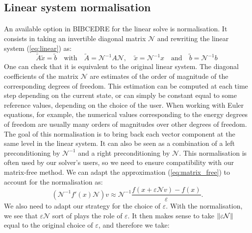     \subsection{Linear system normalisation}

      \paragraph{}
      An available option in BIBCEDRE for the linear solve is normalisation.
      It consists in taking an invertible diagonal matrix $\mathcal{N}$ and rewriting the linear system (\ref{eq:linear}) as:
      \begin{equation}
        \tilde{A}\tilde{x} = \tilde{b}
        \quad\textrm{with}\quad \tilde{A} = \mathcal{N}^{-1} A \mathcal{N},
        \quad \tilde{x} = \mathcal{N}^{-1} x
        \quad\textrm{and}\quad \tilde{b} = \mathcal{N}^{-1} b \
      \end{equation}
      One can check that it is equivalent to the original linear system.
      The diagonal coefficients of the matrix $\mathcal{N}$ are estimates of the order of magnitude of the corresponding degrees of freedom.
      This estimation can be computed at each time step depending on the current state, or can simply be constant equal to some reference values, depending on the choice of the user.
      When working with Euler equations, for example, the numerical values corresponding to the energy degrees of freedom are usually many orders of magnitudes over other degrees of freedom.
      The goal of this normalisation is to bring back each vector component at the same level in the linear system.
      It can also be seen as a combination of a left preconditioning by $\mathcal{N}^{-1}$ and a right preconditioning by $\mathcal{N}$.
      This normalisation is often used by our solver's users, so we need to ensure compatibility with our matrix-free method.
      We can adapt the approximation (\ref{eq:matrix_free}) to account for the normalisation as:
      \begin{equation}
        \left( \mathcal{N}^{-1} f'\left(x\right) \mathcal{N} \right) v \approx \mathcal{N}^{-1} \frac{f\left(x + \varepsilon \mathcal{N} v\right) - f\left(x\right)}{\varepsilon} .
      \end{equation}
      We also need to adapt our strategy for the choice of $\varepsilon$.
      With the normalisation, we see that $\varepsilon \mathcal{N}$ sort of plays the role of $\varepsilon$.
      It then makes sense to take $\norm{\varepsilon \mathcal{N}}$ equal to the original choice of $\varepsilon$, and therefore we take:
